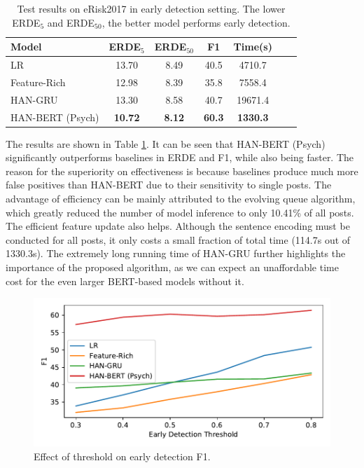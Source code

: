 \begin{table}[h]
    \centering
	\small
    \begin{tabular}{l|cccccc}
        \hline
        Model & ERDE$_5$ & ERDE$_{50}$ & F1 & Time(s) \\
        \hline
        LR & 13.70 & 8.49 & 40.5 & 4710.7 \\
        Feature-Rich & 12.98 & 8.39 & 35.8 & 7558.4 \\
        HAN-GRU & 13.30 & 8.58 & 40.7 & 19671.4 \\
        HAN-BERT (Psych) & \textbf{10.72} & \textbf{8.12} & \textbf{60.3} & \textbf{1330.3} \\
        \hline
    \end{tabular}
    \caption{\label{table:early} Test results on eRisk2017 in early detection setting. The lower ERDE$_5$ and ERDE$_{50}$, the better model performs early detection.}
\end{table}

The results are shown in Table \ref{table:early}. It can be seen that HAN-BERT (Psych) significantly outperforms baselines in ERDE and F1, while also being faster. The reason for the superiority on effectiveness is because baselines produce much more false positives than HAN-BERT due to their sensitivity to single posts. The advantage of efficiency can be mainly attributed to the evolving queue algorithm, which greatly reduced the number of model inference to only 10.41\% of all posts. The efficient feature update also helps. Although the sentence encoding must be conducted for all posts, it only costs a small fraction of total time (114.7s out of 1330.3s). The extremely long running time of HAN-GRU further highlights the importance of the proposed algorithm, as we can expect an unaffordable time cost for the even larger BERT-based models without it. 

\begin{figure}[h]
    \centering
    \includegraphics[width=0.88\columnwidth]{figures/thr2early_f1.pdf}
    \caption{Effect of threshold on early detection F1.}
    \label{fig:thr2early_f1}
\end{figure}

